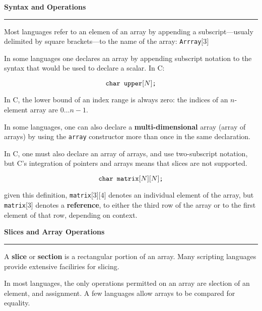 \nopagenumbers
{\bf Syntax and Operations}
\vskip 1mm
\hrule

\vskip 6pt
Most languages refer to an elemen of an array by appending a subscript---usualy delimited by square brackets---to the name of the array: {\tt Arrray$\lbrack 3 \rbrack$}

\vskip 6pt
In some languages one declares an array by appending subscript notation to the syntax that would be used to declare a scalar. In C:

$$\hbox{{\tt char upper$\lbrack N \rbrack$;}}$$

In C, the lower bound of an index range is always zero: the indices of an $n$-element array are $0\ldots n-1$.

\vskip 6pt
In some languages, one can also declare a {\bf multi-dimensional} array (array of arrays) by using the {\tt array} constructor more than once in the same declaration.

\vskip 6pt
In C, one must also declare an array of arrays, and use two-subscript notation, but C's integration of pointers and arrays means that slices are not supported.

$$\hbox{{\tt char matrix$\lbrack N \rbrack$$\lbrack N \rbrack$;}}$$

given this definition, {\tt matrix$\lbrack 3\rbrack \lbrack 4\rbrack$} denotes an individual element of the array, but {\tt matrix$\lbrack 3 \rbrack$} denotes a {\bf reference}, to either the third row of the array or to the first  element of that row, depending on context.

\vskip 12pt

{\bf Slices and Array Operations}
\vskip 1mm
\hrule

\vskip 6pt
A {\bf slice} or {\bf section} is a rectangular portion of an array. Many scripting languages provide extensive faciliries for slicing.

\vskip 6pt
In most languages, the only operations permitted on an array are slection of an element, and assignment. A few languages allow arrays to be compared for equality.


\vfill\eject
\bye
